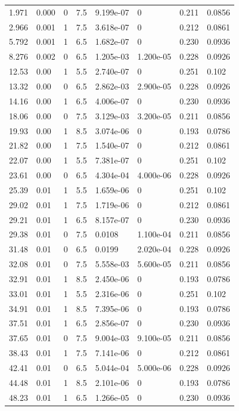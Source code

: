 \documentclass[preview]{standalone}
\begin{document}
{{\begin{tabular}{L{1.2cm}C{1.2cm} C{0.3cm}C{0.5cm} C{1.4cm}C{1.4cm} C{1.4cm}C{1.4cm}}
  1.971  &  0.000  & 0     & 7.5 &  9.199e-07  & 0  & 0.211 &  0.0856   \\ 
  2.966  &  0.001  & 1     & 7.5 &  3.618e-07  & 0  & 0.212 &  0.0861   \\ 
  5.792  &  0.001  & 1     & 6.5 &  1.682e-07  & 0  & 0.230 &  0.0936   \\ 
  8.276  &  0.002  & 0     & 6.5 &  1.205e-03  & 1.200e-05  & 0.228 &  0.0926   \\ 
  12.53  &  0.00  & 1     & 5.5 &  2.740e-07  & 0  & 0.251 &  0.102   \\ 
  13.32  &  0.00  & 0     & 6.5 &  2.862e-03  & 2.900e-05  & 0.228 &  0.0926   \\ 
  14.16  &  0.00  & 1     & 6.5 &  4.006e-07  & 0  & 0.230 &  0.0936   \\ 
  18.06  &  0.00  & 0     & 7.5 &  3.129e-03  & 3.200e-05  & 0.211 &  0.0856   \\ 
  19.93  &  0.00  & 1     & 8.5 &  3.074e-06  & 0  & 0.193 &  0.0786   \\ 
  21.82  &  0.00  & 1     & 7.5 &  1.540e-07  & 0  & 0.212 &  0.0861   \\ 
  22.07  &  0.00  & 1     & 5.5 &  7.381e-07  & 0  & 0.251 &  0.102   \\ 
  23.61  &  0.00  & 0     & 6.5 &  4.304e-04  & 4.000e-06  & 0.228 &  0.0926   \\ 
  25.39  &  0.01  & 1     & 5.5 &  1.659e-06  & 0  & 0.251 &  0.102   \\ 
  29.02  &  0.01  & 1     & 7.5 &  1.719e-06  & 0  & 0.212 &  0.0861   \\ 
  29.21  &  0.01  & 1     & 6.5 &  8.157e-07  & 0  & 0.230 &  0.0936   \\ 
  29.38  &  0.01  & 0     & 7.5 &  0.0108  & 1.100e-04  & 0.211 &  0.0856   \\ 
  31.48  &  0.01  & 0     & 6.5 &  0.0199  & 2.020e-04  & 0.228 &  0.0926   \\ 
  32.08  &  0.01  & 0     & 7.5 &  5.558e-03  & 5.600e-05  & 0.211 &  0.0856   \\ 
  32.91  &  0.01  & 1     & 8.5 &  2.450e-06  & 0  & 0.193 &  0.0786   \\ 
  33.01  &  0.01  & 1     & 5.5 &  2.316e-06  & 0  & 0.251 &  0.102   \\ 
  34.91  &  0.01  & 1     & 8.5 &  7.395e-06  & 0  & 0.193 &  0.0786   \\ 
  37.51  &  0.01  & 1     & 6.5 &  2.856e-07  & 0  & 0.230 &  0.0936   \\ 
  37.65  &  0.01  & 0     & 7.5 &  9.004e-03  & 9.100e-05  & 0.211 &  0.0856   \\ 
  38.43  &  0.01  & 1     & 7.5 &  7.141e-06  & 0  & 0.212 &  0.0861   \\ 
  42.41  &  0.01  & 0     & 6.5 &  5.044e-04  & 5.000e-06  & 0.228 &  0.0926   \\ 
  44.48  &  0.01  & 1     & 8.5 &  2.101e-06  & 0  & 0.193 &  0.0786   \\ 
  48.23  &  0.01  & 1     & 6.5 &  1.266e-05  & 0  & 0.230 &  0.0936   \\ 
\hline 
\end{tabular} 

}}
\end{document}
